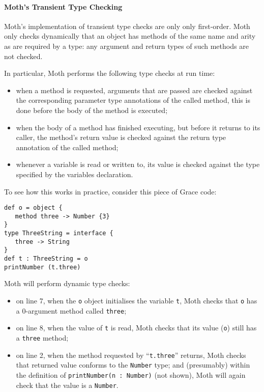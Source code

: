 \documentclass[sigplan,10pt,review,screen]{acmart}\settopmatter{printfolios=true}
\newcommand{\code}[1]{\texttt{#1}}
\begin{document}
\paragraph{Moth's Transient Type Checking}
Moth's implementation of transient type checks are only only first-order.
Moth only checks dynamically that an object has methods of the same name and arity as are required by a type:  any argument and return types of such methods are not checked.

In particular, Moth performs the following type checks at run time:
\begin{itemize}
\item when a method is requested, arguments that are passed are checked against the corresponding parameter type annotations of the called method, this is done before the body of the method is executed;
\item when the body of a method has finished executing, but before it returns to its caller, the method's return value is checked against the return type annotation of the called method;
\item whenever a variable is read or written to, its value is checked against the type specified by the variables declaration.
\end{itemize}

To see how this works in practice, consider this piece of Grace code:

\begin{minipage}{\linewidth}
\begin{lstlisting}
def o = object {
   method three -> Number {3}
}
type ThreeString = interface {
   three -> String
}
def t : ThreeString = o
printNumber (t.three)
\end{lstlisting}
\end{minipage}

Moth will perform dynamic type checks:

\begin{itemize}

\item on line 7,
when the \code{o} object initialises the variable \code{t},
Moth checks that \code{o} has a 0-argument method called \code{three};

\item on line 8,
when the value of \code{t} is read,
Moth checks that its value (\code{o}) still has a \code{three} method;

\item on line 2,
when the method requested by ``\code{t.three}'' returns,
Moth checks that returned value conforms to the \code{Number} type;
and (presumably) within the definition of
%
\code{printNumber(n :   Number)}
%
(not shown), Moth will again check that the value is a \code{Number}.
\end{itemize}
\end{document}
